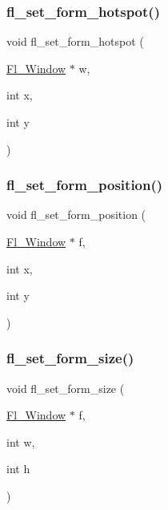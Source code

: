 \subsubsection{\texorpdfstring{fl\+\_\+set\+\_\+form\+\_\+hotspot()}{fl\_set\_form\_hotspot()}}
{\footnotesize\ttfamily void fl\+\_\+set\+\_\+form\+\_\+hotspot (\begin{DoxyParamCaption}\item[{\hyperlink{class_fl___window}{Fl\+\_\+\+Window} $\ast$}]{w,  }\item[{int}]{x,  }\item[{int}]{y }\end{DoxyParamCaption})\hspace{0.3cm}{\ttfamily [inline]}}

\mbox{\label{forms_8_h_ad19cb000c04e4e2029a4f636501e7bf2}} 
\subsubsection{\texorpdfstring{fl\+\_\+set\+\_\+form\+\_\+position()}{fl\_set\_form\_position()}}
{\footnotesize\ttfamily void fl\+\_\+set\+\_\+form\+\_\+position (\begin{DoxyParamCaption}\item[{\hyperlink{class_fl___window}{Fl\+\_\+\+Window} $\ast$}]{f,  }\item[{int}]{x,  }\item[{int}]{y }\end{DoxyParamCaption})\hspace{0.3cm}{\ttfamily [inline]}}

\mbox{\label{forms_8_h_a4d8922c99c042943dc14543435b9e961}} 
\subsubsection{\texorpdfstring{fl\+\_\+set\+\_\+form\+\_\+size()}{fl\_set\_form\_size()}}
{\footnotesize\ttfamily void fl\+\_\+set\+\_\+form\+\_\+size (\begin{DoxyParamCaption}\item[{\hyperlink{class_fl___window}{Fl\+\_\+\+Window} $\ast$}]{f,  }\item[{int}]{w,  }\item[{int}]{h }\end{DoxyParamCaption})\hspace{0.3cm}{\ttfamily [inline]}}


